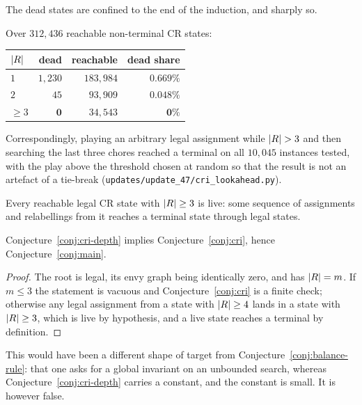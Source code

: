 The dead states are confined to the end of the induction, and sharply so.

\begin{observation}
\label{obs:cri-depth}
Over $312{,}436$ reachable non-terminal CR states:
\begin{center}\small
\begin{tabular}{@{}lrrr@{}}
\toprule
$\left\lvert R\right\rvert$ & dead & reachable & dead share \\
\midrule
$1$        & $1{,}230$ & $183{,}984$ & $0.669\%$ \\
$2$        & $45$      & $93{,}909$  & $0.048\%$ \\
$\ge 3$    & $\mathbf{0}$ & $34{,}543$ & $\mathbf{0\%}$ \\
\bottomrule
\end{tabular}
\end{center}
Correspondingly, playing an arbitrary legal assignment while $\left\lvert R\right\rvert > 3$ and
then searching the last three chores reached a terminal on all $10{,}045$
instances tested, with the play above the threshold chosen at random so that the
result is not an artefact of a tie-break
(\texttt{updates/update\_47/cri\_lookahead.py}).
\end{observation}

\begin{conjecture}
\label{conj:cri-depth}
Every reachable legal CR state with $\left\lvert R\right\rvert \ge 3$ is live: some sequence of
assignments and relabellings from it reaches a terminal state through legal
states.
\end{conjecture}

\begin{proposition}
\label{prop:cri-depth-implies}
Conjecture~\ref{conj:cri-depth} implies Conjecture~\ref{conj:cri}, hence
Conjecture~\ref{conj:main}.
\end{proposition}

\begin{proof}
The root is legal, its envy graph being identically zero, and has
$\left\lvert R\right\rvert = m$. If $m \le 3$ the statement is vacuous and
Conjecture~\ref{conj:cri} is a finite check; otherwise any legal assignment from
a state with $\left\lvert R\right\rvert \ge 4$ lands in a state with $\left\lvert R\right\rvert \ge 3$, which is
live by hypothesis, and a live state reaches a terminal by definition.
\end{proof}

This would have been a different shape of target from
Conjecture~\ref{conj:balance-rule}: that one asks for a global invariant on an
unbounded search, whereas Conjecture~\ref{conj:cri-depth} carries a constant, and
the constant is small. It is however false.

